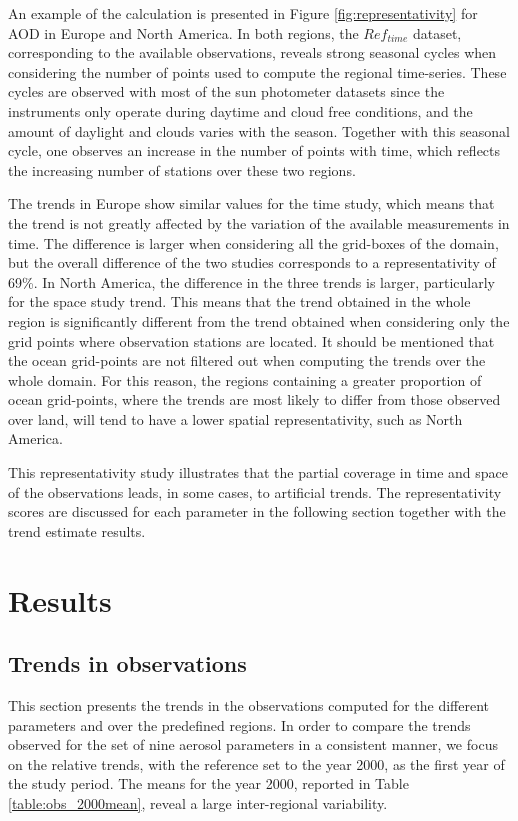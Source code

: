 \documentclass[acp, manuscript]{copernicus}
\begin{document}
An example of the calculation is presented in Figure \ref{fig:representativity} for AOD in Europe and North America. In both regions, the $Ref_{time}$ dataset, corresponding to the available observations, reveals strong seasonal cycles when considering the number of points used to compute the regional time-series. These cycles are observed with most of the sun photometer datasets since the instruments only operate during daytime and cloud free conditions, and the amount of daylight and clouds varies with the season. Together with this seasonal cycle, one observes an increase in the number of points with time, which reflects the increasing number of stations over these two regions. 

The trends in Europe show similar values for the time study, which means that the trend is not greatly affected by the variation of the available measurements in time. The difference is larger when considering all the grid-boxes of the domain, but the overall difference of the two studies corresponds to a representativity of 69\%. In North America, the difference in the three trends is larger, particularly for the space study trend. This means that the trend obtained in the whole region is significantly different from the trend obtained when considering only the grid points where observation stations are located. It should be mentioned that the ocean grid-points are not filtered out when computing the trends over the whole domain. For this reason, the regions containing a greater proportion of ocean grid-points, where the trends are most likely to differ from those observed over land, will tend to have a lower spatial representativity, such as North America.

This representativity study illustrates that the partial coverage in time and space of the observations leads, in some cases, to artificial trends. The representativity scores are discussed for each parameter in the following section together with the trend estimate results.

\section{Results}

\subsection{Trends in observations}\label{obs_trends}
This section presents the trends in the observations computed for the different parameters and over the predefined regions. In order to compare the trends observed for the set of nine aerosol parameters in a consistent manner, we focus on the relative trends, with the reference set to the year 2000, as the first year of the study period. The means for the year 2000, reported in Table \ref{table:obs_2000mean}, reveal a large inter-regional variability.
\end{document}
